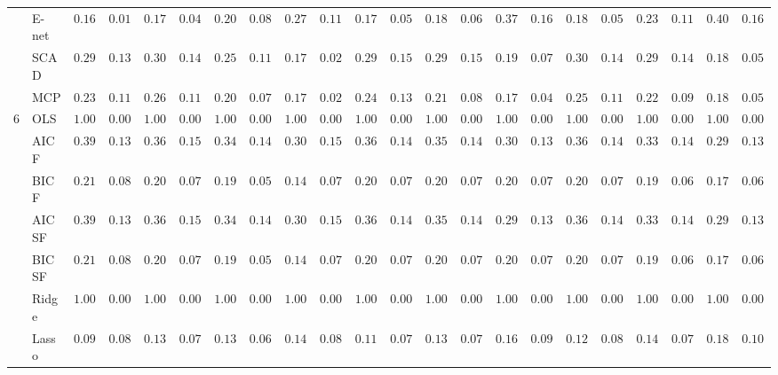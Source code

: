 \begin{tabular}{ll|ll|llllll|llllll|llllll}
 & E-net  & $0.1683$ & $0.0167$ & $0.1783$ & $0.0489$ & $0.2050$ & $0.0882$ & $0.2733$ & $0.1197$ & $0.1783$ & $0.0592$ & $0.1883$ & $0.0611$ & $0.3700$ & $0.1668$ & $0.1833$ & $0.0556$ & $0.2317$ & $0.1108$ & $0.4067$ & $0.1647$ \\
 & SCAD  & $0.2933$ & $0.1300$ & $0.3050$ & $0.1403$ & $0.2550$ & $0.1195$ & $0.1717$ & $0.0286$ & $0.2917$ & $0.1560$ & $0.2917$ & $0.1505$ & $0.1933$ & $0.0776$ & $0.3017$ & $0.1415$ & $0.2950$ & $0.1438$ & $0.1850$ & $0.0524$ \\
 & MCP  & $0.2383$ & $0.1142$ & $0.2633$ & $0.1189$ & $0.2017$ & $0.0722$ & $0.1700$ & $0.0235$ & $0.2483$ & $0.1371$ & $0.2150$ & $0.0831$ & $0.1783$ & $0.0427$ & $0.2500$ & $0.1173$ & $0.2200$ & $0.0914$ & $0.1833$ & $0.0503$ \\\hline
6 & OLS  & $1.0000$ & $0.0000$ & $1.0000$ & $0.0000$ & $1.0000$ & $0.0000$ & $1.0000$ & $0.0000$ & $1.0000$ & $0.0000$ & $1.0000$ & $0.0000$ & $1.0000$ & $0.0000$ & $1.0000$ & $0.0000$ & $1.0000$ & $0.0000$ & $1.0000$ & $0.0000$ \\
 & AIC F  & $0.3933$ & $0.1392$ & $0.3683$ & $0.1522$ & $0.3417$ & $0.1409$ & $0.3050$ & $0.1554$ & $0.3600$ & $0.1493$ & $0.3533$ & $0.1427$ & $0.3000$ & $0.1381$ & $0.3617$ & $0.1403$ & $0.3333$ & $0.1479$ & $0.2917$ & $0.1327$ \\
 & BIC F  & $0.2167$ & $0.0803$ & $0.2050$ & $0.0705$ & $0.1900$ & $0.0581$ & $0.1417$ & $0.0725$ & $0.2033$ & $0.0733$ & $0.2033$ & $0.0733$ & $0.2083$ & $0.0799$ & $0.2067$ & $0.0754$ & $0.1933$ & $0.0614$ & $0.1783$ & $0.0638$ \\
 & AIC SF  & $0.3900$ & $0.1365$ & $0.3683$ & $0.1522$ & $0.3433$ & $0.1418$ & $0.3017$ & $0.1548$ & $0.3600$ & $0.1493$ & $0.3517$ & $0.1419$ & $0.2967$ & $0.1393$ & $0.3633$ & $0.1409$ & $0.3317$ & $0.1470$ & $0.2917$ & $0.1327$ \\
 & BIC SF  & $0.2167$ & $0.0803$ & $0.2050$ & $0.0705$ & $0.1900$ & $0.0581$ & $0.1417$ & $0.0725$ & $0.2033$ & $0.0733$ & $0.2033$ & $0.0733$ & $0.2067$ & $0.0754$ & $0.2067$ & $0.0754$ & $0.1933$ & $0.0614$ & $0.1783$ & $0.0638$ \\
 & Ridge  & $1.0000$ & $0.0000$ & $1.0000$ & $0.0000$ & $1.0000$ & $0.0000$ & $1.0000$ & $0.0000$ & $1.0000$ & $0.0000$ & $1.0000$ & $0.0000$ & $1.0000$ & $0.0000$ & $1.0000$ & $0.0000$ & $1.0000$ & $0.0000$ & $1.0000$ & $0.0000$ \\
 & Lasso  & $0.0917$ & $0.0866$ & $0.1300$ & $0.0771$ & $0.1383$ & $0.0672$ & $0.1417$ & $0.0898$ & $0.1100$ & $0.0793$ & $0.1317$ & $0.0722$ & $0.1683$ & $0.0902$ & $0.1200$ & $0.0857$ & $0.1400$ & $0.0739$ & $0.1817$ & $0.1008$ \\

\end{tabular}
